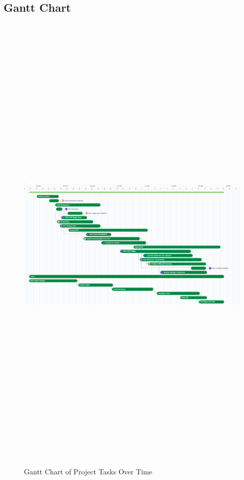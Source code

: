 \documentclass[titlepage,draft]{article}
\begin{document}
\subsection{Gantt Chart}

\begin{figure}[H]
	\centering
	\includegraphics[angle=90,height=9in]{gantt}
	\caption{Gantt Chart of Project Tasks Over Time}
	\label{fig:gantt_chart}
\end{figure}
\end{document}
